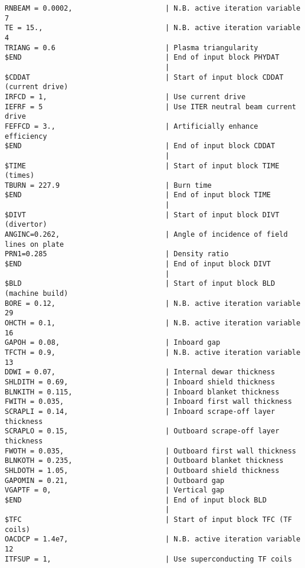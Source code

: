 \begin{verbatim}
RNBEAM = 0.0002,                      | N.B. active iteration variable 7
TE = 15.,                             | N.B. active iteration variable 4
TRIANG = 0.6                          | Plasma triangularity
$END                                  | End of input block PHYDAT
                                      | 
$CDDAT                                | Start of input block CDDAT (current drive)
IRFCD = 1,                            | Use current drive
IEFRF = 5                             | Use ITER neutral beam current drive
FEFFCD = 3.,                          | Artificially enhance efficiency
$END                                  | End of input block CDDAT
                                      | 
$TIME                                 | Start of input block TIME (times)
TBURN = 227.9                         | Burn time
$END                                  | End of input block TIME
                                      | 
$DIVT                                 | Start of input block DIVT (divertor)
ANGINC=0.262,                         | Angle of incidence of field lines on plate
PRN1=0.285                            | Density ratio
$END                                  | End of input block DIVT
                                      | 
$BLD                                  | Start of input block BLD (machine build)
BORE = 0.12,                          | N.B. active iteration variable 29
OHCTH = 0.1,                          | N.B. active iteration variable 16
GAPOH = 0.08,                         | Inboard gap
TFCTH = 0.9,                          | N.B. active iteration variable 13
DDWI = 0.07,                          | Internal dewar thickness
SHLDITH = 0.69,                       | Inboard shield thickness
BLNKITH = 0.115,                      | Inboard blanket thickness
FWITH = 0.035,                        | Inboard first wall thickness
SCRAPLI = 0.14,                       | Inboard scrape-off layer thickness
SCRAPLO = 0.15,                       | Outboard scrape-off layer thickness
FWOTH = 0.035,                        | Outboard first wall thickness
BLNKOTH = 0.235,                      | Outboard blanket thickness
SHLDOTH = 1.05,                       | Outboard shield thickness
GAPOMIN = 0.21,                       | Outboard gap
VGAPTF = 0,                           | Vertical gap
$END                                  | End of input block BLD
                                      | 
$TFC                                  | Start of input block TFC (TF coils)
OACDCP = 1.4e7,                       | N.B. active iteration variable 12
ITFSUP = 1,                           | Use superconducting TF coils

\end{verbatim}
